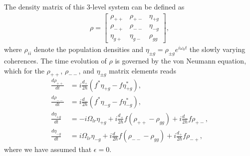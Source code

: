 \documentclass[reprint,secnumarabic,amssymb, nobibnotes, aip, prd]{revtex4-1}
\begin{document}
The density matrix of this 3-level system can be defined as 
\begin{align}
\rho = \begin{bmatrix}
\rho_{++} & \rho_{+-} & \eta_{+g} \\ 
\rho_{-+} & \rho_{--} & \eta_{-g} \\
\eta_{g+} & \eta_{g-} & \rho_{gg}
\end{bmatrix},
\end{align}
where $\rho_{ii}$ denote the population densities and $\eta_{\pm g} = \rho_{\pm g}e^{i\omega_0t}$ the slowly varying coherences. The time evolution of $\rho$ is governed by the von Neumann equation, which for the $\rho_{++}$, $\rho_{--}$, and $\eta_{\pm g}$ matrix elements reads  
\begin{subequations}
	\label{eq:4eqns}
	\begin{align}
	\frac{d \rho_{++}}{dt} &= i\frac{d_{+}}{2\hbar}(f^*\eta_{+g}-f\eta_{+g}^*), \\
	\frac{d \rho_{--}}{dt} &= i\frac{d_{-}}{2\hbar}(f^*\eta_{-g}-f\eta_{-g}^*), \\
	\frac{d \eta_{+g}}{dt} &= -i\Omega_{lr}\eta_{+g}+i\frac{d_{+}}{2\hbar}f(\rho_{++}-\rho_{gg})+i\frac{d_{-}}{2\hbar}f\rho_{+-}, \label{eq:eta+a}\\
	\frac{d \eta_{-g}}{dt} &= i\Omega_{lr}\eta_{-g}+i\frac{d_{-}}{2\hbar}f(\rho_{--}-\rho_{gg})+i\frac{d_{+}}{2\hbar}f\rho_{-+}, \label{eq:eta-a}
	\end{align}
\end{subequations}
where we have assumed that $\epsilon = 0$. 
\end{document}

